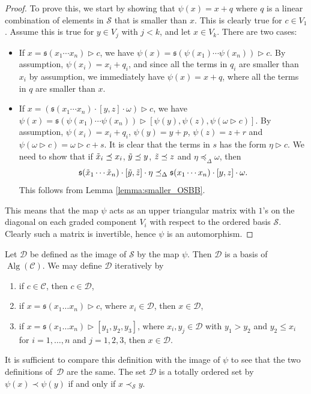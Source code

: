 \documentclass[10pt,a4paper]{amsart}
\newcommand*{\Alg}{\operatorname{Alg}}
\numberwithin{equation}{section}
\begin{document}
\begin{proof}
 To prove this, we start by showing that $\psi(x) = x + q$ where $q$ is a linear combination of elements in $\mathcal{S}$ that is smaller than $x$. This is clearly true for $c \in V_1$. Assume this is true for $y \in V_j$ with $j<k$, and let $x \in V_k$. There are two cases:
 \begin{itemize}\itemsep=0pt
 \item If $x = \mathfrak{s}(x_1 \cdots x_n) \rhd c$, we have $\psi(x) = \mathfrak{s}(\psi(x_1) \cdots \psi(x_n)) \rhd c$. By assumption, $\psi(x_i) = x_i +q_i$, and since all the terms in $q_i$ are smaller than $x_i$ by assumption, we immediately have $\psi(x) = x + q$, where all the terms in $q$ are smaller than $x$.
 \item If $x = (\mathfrak{s}(x_1 \cdots x_n) \cdot [y, z] \cdot \omega) \rhd c$, we have $\psi(x) = \mathfrak{s}(\psi(x_1) \cdots \psi(x_n)) \rhd [\psi(y), \psi(z), \psi(\omega \rhd c)]$. By assumption, $\psi(x_i) = x_i + q_i$, $\psi(y) = y + p$, $\psi(z) = z + r$ and $\psi(\omega \rhd c) = \omega \rhd c + s$. It is clear that the terms in $s$ has the form $\eta \rhd c$. We need to show that if $\Tilde{x}_i\preceq x_i$, $\Tilde{y} \preceq y$, $\Tilde{z} \preceq z$ and $\eta \preceq_{\Delta} \omega$, then
 \[
 \mathfrak{s}(\Tilde{x}_1 \cdots \Tilde{x}_n) \cdot [\Tilde{y}, \Tilde{z}] \cdot \eta \preceq_{\Delta} \mathfrak{s}(x_1 \cdots x_n) \cdot [y, z] \cdot \omega.
 \]
 This follows from Lemma \ref{lemma:smaller_OSBB}.
 \end{itemize}
 This means that the map $\psi$ acts as an upper triangular matrix with $1$'s on the diagonal on each graded component $V_i$ with respect to the ordered basis $\mathcal{S}$. Clearly such a matrix is invertible, hence $\psi$ is an automorphism.
\end{proof}

Let $\mathcal{D}$ be defined as the image of $\mathcal{S}$ by the map $\psi$. Then $\mathcal{D}$ is a basis of $\Alg(\mathcal{C})$. We may define $\mathcal{D}$ iteratively by
\begin{enumerate}\itemsep=0pt
 \item[(i)] if $c \in \mathcal{C}$, then $c \in \mathcal{D}$,
 \item[(ii)] if $x = \mathfrak{s}(x_1 \dots x_n) \rhd c$, where $x_i \in \mathcal{D}$, then $x \in \mathcal{D}$,
 \item[(iii)] if $x = \mathfrak{s}(x_1 \dots x_n) \rhd [y_1, y_2, y_3]$, where $x_i, y_j \in \mathcal{D}$ with $y_1 > y_2$ and $y_2 \leq x_i$ for $i=1, \dots , n$ and $j=1,2,3$, then $x \in \mathcal{D}$.
\end{enumerate}
It is sufficient to compare this definition with the image of $\psi$ to see that the two definitions of~$\mathcal{D}$ are the same. The set $\mathcal{D}$ is a totally ordered set by $\psi(x) \prec \psi(y)$ if and only if $x \prec_{\mathcal{S}} y$.
\end{document}
